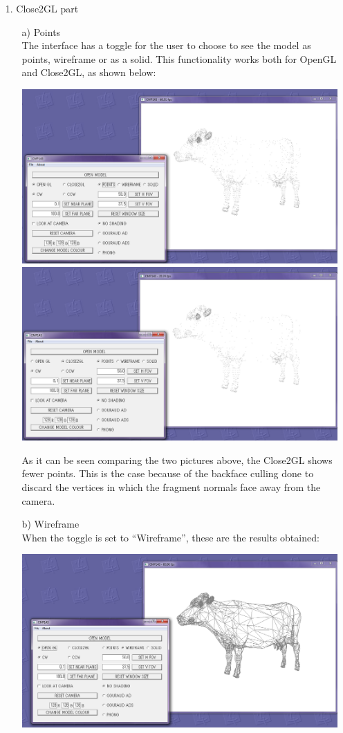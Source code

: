 \documentclass[12pt]{article}
\begin{document}
\begin{itemize}
\item[1.] Close2GL part
\begin{itemize}
\item[a)] Points\\
The interface has a toggle for the user to choose to see the model as points, wireframe or as a solid. This functionality works both for OpenGL and Close2GL, as shown below:
\begin{center}
\includegraphics[scale=0.4]{2.png}
\includegraphics[scale=0.4]{3.png}
\end{center}
As it can be seen comparing the two pictures above, the Close2GL shows fewer points. This is the case because of the backface culling done to discard the vertices in which the fragment normals face away from the camera.
\item[b)] Wireframe\\
When the toggle is set to ``Wireframe'', these are the results obtained:
\begin{center}
\includegraphics[scale=0.4]{4.png}

\end{center}
\end{itemize}
\end{itemize}
\end{document}
